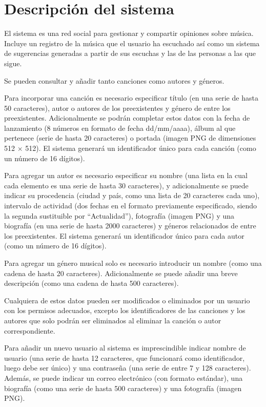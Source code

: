 
\section{Descripción del sistema} %

El sistema es una red social para gestionar y compartir opiniones sobre música. Incluye un registro de la música que el usuario ha escuchado así como un sistema de sugerencias generadas a partir de sus escuchas y las de las personas a las que sigue.

Se pueden consultar y añadir tanto canciones como autores y géneros.

Para incorporar una canción es necesario especificar título (en una serie de hasta 50 caracteres), autor o autores de los preexistentes y género de entre los preexistentes. Adicionalmente se podrán completar estos datos con la fecha de lanzamiento (8 números en formato de fecha dd/mm/aaaa), álbum al que pertenece (serie de hasta 20 caracteres) o portada (imagen PNG de dimensiones 512 $\times$ 512). El sistema generará un identificador único para cada canción (como un número de 16 dígitos).

Para agregar un autor es necesario especificar su nombre (una lista en la cual cada elemento es una serie de hasta 30 caracteres), y adicionalmente se puede indicar su procedencia (ciudad y país, como una lista de 20 caracteres cada uno), intervalo de actividad (dos fechas en el formato previamente especificado, siendo la segunda sustituible por ``Actualidad''), fotografía (imagen PNG) y una biografía (en una serie de hasta 2000 caracteres) y géneros relacionados de entre los preexistentes. El sistema generará un identificador único para cada autor (como un número de 16 dígitos).

Para agregar un género musical solo es necesario introducir un nombre (como una cadena de hasta 20 caracteres). Adicionalmente se puede añadir una breve descripción (como una cadena de hasta 500 caracteres).

Cualquiera de estos datos pueden ser modificados o eliminados por un usuario con los permisos adecuados, excepto los identificadores de las canciones y los autores que solo podrán ser eliminados al eliminar la canción o autor correspondiente.


Para añadir un nuevo usuario al sistema es imprescindible indicar nombre de usuario (una serie de hasta 12 caracteres, que funcionará como identificador, luego debe ser único) y una contraseña (una serie de entre 7 y 128 caracteres). Además, se puede indicar un correo electrónico (con formato estándar), una biografía (como una serie de hasta 500 caracteres) y una fotografía (imagen PNG).

